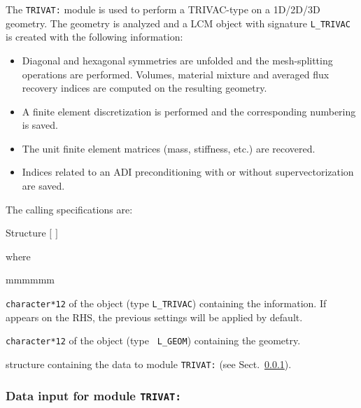 The {\tt TRIVAT:} module is used to perform a TRIVAC-type  on a
1D/2D/3D geometry.\cite{SVAT1,SVAT2,MCFD,Trivac,mixte-dual,benaboud} The
geometry is analyzed and a LCM object with signature {\tt L\_TRIVAC} is
created with the following information:

\begin{itemize}
\item Diagonal and hexagonal symmetries are unfolded and the mesh-splitting 
operations are performed. Volumes, material mixture and averaged flux recovery
indices are computed on the resulting geometry. \item A finite element
discretization is performed and the corresponding numbering is saved. \item The
unit finite element matrices (mass, stiffness, etc.) are recovered. \item
Indices related to an ADI preconditioning with or without supervectorization
are saved. \end{itemize}

The calling specifications are:

\begin{DataStructure}{Structure }
 \moc{:=}  $[$  $]$   \moc{::} 
\end{DataStructure}

\goodbreak
\noindent where
\begin{ListeDeDescription}{mmmmmm}

\item[\dusa{TRACK}] {\tt character*12} of the  object (type {\tt L\_TRIVAC}) 
containing the  information. If  appears on the RHS, the
previous settings will be applied by default.

\item[\dusa{GEOM}] {\tt character*12} of the  object (type {\tt
L\_GEOM}) containing the geometry.

\item[\dstr{trivat\_data}] structure containing  the data to module {\tt TRIVAT:} (see Sect.~\ref{sect:trivat_data}).

\end{ListeDeDescription}

\vskip 0.2cm

\subsubsection{Data input for module {\tt TRIVAT:}}\label{sect:trivat_data}


